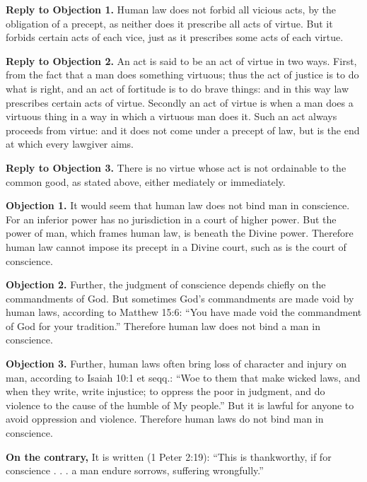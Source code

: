 \textbf{Reply to Objection 1.} Human law does not forbid all vicious acts, by the obligation of a precept, as neither does it prescribe all acts of virtue. But it forbids certain acts of each vice, just as it prescribes some acts of each virtue.

\textbf{Reply to Objection 2.} An act is said to be an act of virtue in two ways. First, from the fact that a man does something virtuous; thus the act of justice is to do what is right, and an act of fortitude is to do brave things: and in this way law prescribes certain acts of virtue. Secondly an act of virtue is when a man does a virtuous thing in a way in which a virtuous man does it. Such an act always proceeds from virtue: and it does not come under a precept of law, but is the end at which every lawgiver aims.

\textbf{Reply to Objection 3.} There is no virtue whose act is not ordainable to the common good, as stated above, either mediately or immediately.


\textbf{Objection 1.} It would seem that human law does not bind man in conscience. For an inferior power has no jurisdiction in a court of higher power. But the power of man, which frames human law, is beneath the Divine power. Therefore human law cannot impose its precept in a Divine court, such as is the court of conscience.

\textbf{Objection 2.} Further, the judgment of conscience depends chiefly on the commandments of God. But sometimes God's commandments are made void by human laws, according to Matthew 15:6: ``You have made void the commandment of God for your tradition.'' Therefore human law does not bind a man in conscience.

\textbf{Objection 3.} Further, human laws often bring loss of character and injury on man, according to Isaiah 10:1 et seqq.: ``Woe to them that make wicked laws, and when they write, write injustice; to oppress the poor in judgment, and do violence to the cause of the humble of My people.'' But it is lawful for anyone to avoid oppression and violence. Therefore human laws do not bind man in conscience.

\textbf{On the contrary,} It is written (1 Peter 2:19): ``This is thankworthy, if for conscience . . . a man endure sorrows, suffering wrongfully.''

